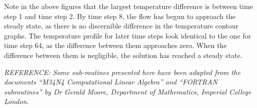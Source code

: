 \documentclass[12pt]{article}
\begin{document}
Note in the above figures that the largest temperature difference is between time step 1 and time step 2. By time step 8, the flow has begun to approach the steady state, as there is no discernible difference in the temperature contour graphs. The temperature profile for later time steps look identical to the one for time step 64, as the difference between them approaches zero. When the difference between them is negligible, the solution has reached a steady state.

\newpage

\emph{REFERENCE: Some sub-routines presented here have been adapted from the documents ``M34N4 Computational Linear Algebra'' and ``FORTRAN subroutines'' by Dr Gerald Moore, Department of Mathematics, Imperial College London.}
\end{document}
